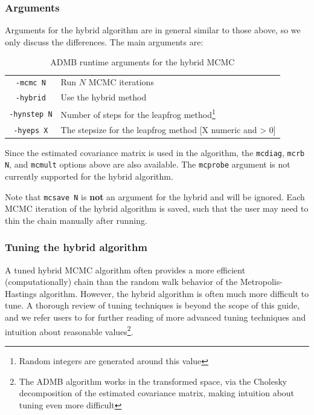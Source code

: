 \documentclass{article}\usepackage[]{graphicx}\usepackage[]{color}
\begin{document}
\subsubsection{Arguments}
Arguments for the hybrid algorithm are in general similar to those above,
so we only discuss the differences. The main arguments are:
\begin{table}[h]
  \centering
  \begin{tabular}[h]{|cl|}
    \hline
    \texttt{-mcmc N} & Run $N$ MCMC iterations\\
    \texttt{-hybrid} & Use the hybrid method\\
    \texttt{-hynstep N} & Number of steps for the leapfrog
    method\footnote{Random integers are generated around this value}\\
    \texttt{-hyeps X} & The stepsize for the leapfrog method [X numeric and > 0]\\
    \hline
  \end{tabular}
  \caption{ADMB runtime arguments for the hybrid MCMC}
  \label{tab:hy_args}
\end{table}
Since the estimated covariance matrix is used in the algorithm, the
\texttt{mcdiag}, \texttt{mcrb N}, and \texttt{mcmult} options above are
also available. The \texttt{mcprobe} argument is not currently supported
for the hybrid algorithm.

Note that \texttt{mcsave N} is \textbf{not} an argument for the hybrid and
will be ignored. Each MCMC iteration of the hybrid algorithm is saved, such
that the user may need to thin the chain manually after running.

\subsubsection{Tuning the hybrid algorithm}
A tuned hybrid MCMC algorithm often provides a more efficient
(computationally) chain than the random walk behavior of the
Metropolis-Hastings algorithm. However, the hybrid algorithm is often much
more difficult to tune. A thorough review of tuning techniques is beyond
the scope of this guide, and we refer users to \cite{brooks2011} for
further reading of more advanced tuning techniques and intuition about
reasonable values\footnote{The ADMB algorithm works in the transformed
  space, via the Cholesky decomposition of the estimated covariance matrix,
  making intuition about tuning even more difficult}.
\end{document}
